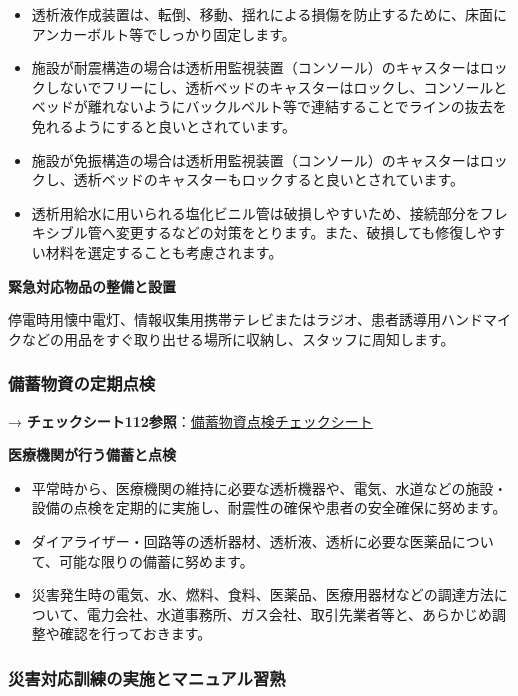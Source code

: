 \documentclass[
  japanese,
  letterpaper,
  DIV=11,
  numbers=noendperiod]{scrartcl}
\providecommand{\tightlist}{%
  \setlength{\itemsep}{0pt}\setlength{\parskip}{0pt}}
\begin{document}
\begin{itemize}
\tightlist
\item
  透析液作成装置は、転倒、移動、揺れによる損傷を防止するために、床面にアンカーボルト等でしっかり固定します。
\item
  施設が耐震構造の場合は透析用監視装置（コンソール）のキャスターはロックしないでフリーにし、透析ベッドのキャスターはロックし、コンソールとベッドが離れないようにバックルベルト等で連結することでラインの抜去を免れるようにすると良いとされています。
\item
  施設が免振構造の場合は透析用監視装置（コンソール）のキャスターはロックし、透析ベッドのキャスターもロックすると良いとされています。
\item
  透析用給水に用いられる塩化ビニル管は破損しやすいため、接続部分をフレキシブル管へ変更するなどの対策をとります。また、破損しても修復しやすい材料を選定することも考慮されます。
\end{itemize}

\textbf{緊急対応物品の整備と設置}

停電時用懐中電灯、情報収集用携帯テレビまたはラジオ、患者誘導用ハンドマイクなどの用品をすぐ取り出せる場所に収納し、スタッフに周知します。

\subsubsection{備蓄物資の定期点検}\label{ux5099ux84c4ux7269ux8cc7ux306eux5b9aux671fux70b9ux691c}

→
\textbf{チェックシート112参照}：\href{1320_備蓄物資点検チェックシート.qmd}{備蓄物資点検チェックシート}

\textbf{医療機関が行う備蓄と点検}

\begin{itemize}
\tightlist
\item
  平常時から、医療機関の維持に必要な透析機器や、電気、水道などの施設・設備の点検を定期的に実施し、耐震性の確保や患者の安全確保に努めます。
\item
  ダイアライザー・回路等の透析器材、透析液、透析に必要な医薬品について、可能な限りの備蓄に努めます。
\item
  災害発生時の電気、水、燃料、食料、医薬品、医療用器材などの調達方法について、電力会社、水道事務所、ガス会社、取引先業者等と、あらかじめ調整や確認を行っておきます。
\end{itemize}

\subsubsection{災害対応訓練の実施とマニュアル習熟}\label{ux707dux5bb3ux5bfeux5fdcux8a13ux7df4ux306eux5b9fux65bdux3068ux30deux30cbux30e5ux30a2ux30ebux7fd2ux719f}
\end{document}
